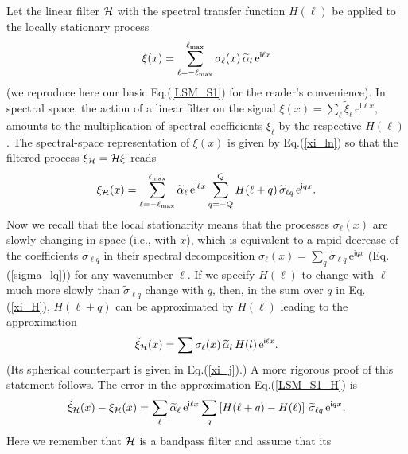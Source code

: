 \documentclass[12pt]{article}
\newcommand{\ie}{i.e., }
\newcommand{\e}{\mathrm{e}}
\renewcommand{\i}{\mathsf{i}}
\begin{document}
Let the linear filter ${\cal H}$ with the spectral transfer function $H(\ell)$ be applied
to the locally stationary 
process 
%
\begin {equation}
\label{LSM_S1_}
\xi (x) =  \sum_{\ell=-\ell_{\rm max}}^{\ell_{\rm max}}  \sigma_\ell(x)  
                          \,\widetilde\alpha_{l} \, \e^{\i \ell x}
\end {equation}
%
(we reproduce here our basic Eq.(\ref{LSM_S1}) for the reader's convenience).
In spectral space, the action of a linear filter on the signal
$\xi (x) = \sum_\ell   \widetilde\xi_\ell \,\e^{\i \ell x},$ amounts to the 
multiplication of spectral coefficients $\widetilde\xi_\ell$ by the respective $H(\ell)$.
The spectral-space representation of $\xi(x)$ is given by Eq.(\ref{xi_ln}) so that
the filtered process $\xi_{\cal H} = {\cal H}\xi$ reads
%
\begin {equation}
\label{xi_H}
\xi_{\cal H} (x) =  \sum_{\ell=-\ell_{\rm max}}^{\ell_{\rm max}} \widetilde\alpha_{\ell} \, \e^{\i \ell x} 
           \sum_{q=-Q}^{Q} H(\ell+q) \,\widetilde\sigma_{\ell q} \, \e^{\i  q x}.
\end {equation}
%
Now we recall that the local stationarity means that the processes $\sigma_\ell(x)$ 
are slowly changing in space (\ie with $x$), which is equivalent to a  rapid decrease of the 
coefficients $\widetilde\sigma_{\ell q}$ in 
their spectral decomposition 
$\sigma_\ell(x) = \sum_q  \widetilde\sigma_{\ell q} \, \e^{\i  q x}$ 
(Eq.(\ref{sigma_lq})) for any wavenumber $\ell$. 
If  we specify  $H(\ell)$ to change  with $\ell$ much more slowly than $ \widetilde\sigma_{\ell q}$
change with $q$, then,
in the sum over $q$ in Eq.(\ref{xi_H}),  $H(\ell+q)$ 
can be approximated by  $H(\ell)$ leading to the approximation
%
\begin {equation}
\label{LSM_S1_H}
\check\xi_{\cal H} (x) =  \sum  \sigma_\ell(x)  
                          \,\widetilde\alpha_{l} \, H(l) \,\e^{\i \ell x}.
\end {equation}
%
(Its spherical counterpart is given in Eq.(\ref{xi_j}).)
A more rigorous proof of this statement follows.
The error in the approximation Eq.(\ref{LSM_S1_H}) is
%
\begin {equation}
\label{LSM_S1_H_err}
\check\xi_{\cal H} (x)  - \xi_{\cal H} (x) =  
   \sum_{\ell} \widetilde\alpha_{\ell} \, \e^{\i \ell x} 
   \sum_{q} \left[ H(\ell+q) - H(\ell) \right] \,\widetilde\sigma_{\ell q} \, \e^{\i  q x},
\end {equation}
%
Here we remember that ${\cal H}$ is a bandpass filter and assume that its 
\end{document}
